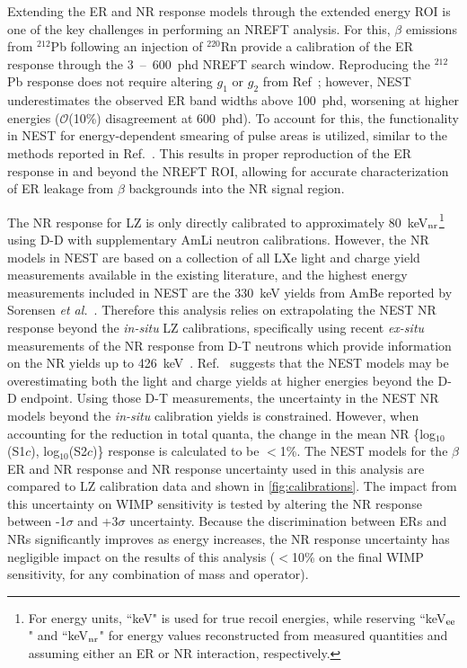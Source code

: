 \documentclass[reprint, showpacs,
preprintnumbers,
amsmath,amssymb,
aps, floatfix,
superscriptaddress,
prd, nofootinbib]{revtex4-1}
\begin{document}
Extending the ER and NR response models through the extended energy ROI is one of the key challenges in performing an NREFT analysis. For this, $\beta$ emissions from ${}^{212}$Pb following an injection of ${}^{220}$Rn provide a calibration of the ER response through the 3~--~600~phd NREFT search window. 
Reproducing the ${}^{212}$Pb response does not require altering $g_1$ or $g_2$ from Ref~\cite{LZ:SR1WS_2022}; however, NEST underestimates the observed ER band widths above 100~phd, worsening at higher energies ($\mathcal{O}$(10\%) disagreement at 600~phd). 
To account for this, the functionality in NEST for energy-dependent smearing of pulse areas is utilized, similar to the methods reported in Ref.~\cite{LUX:ER_modelling_2020}. 
This results in proper reproduction of the ER response in and beyond the NREFT ROI, allowing for accurate characterization of ER leakage from $\beta$ backgrounds into the NR signal region.
\par
The NR response for LZ is only directly calibrated to approximately 80~keV$_{\rm{nr}}$\footnote{For energy units, ``keV" is used for true recoil energies, while reserving ``keV$_{\rm{ee}}$" and ``keV$_{\rm{nr}}$" for energy values reconstructed from measured quantities and assuming either an ER or NR interaction, respectively.} using D-D with supplementary AmLi neutron calibrations. However, the NR models in NEST are based on a collection of all LXe light and charge yield measurements available in the existing literature, and 
the highest energy measurements included in NEST are the 330~keV yields from AmBe reported by Sorensen \textit{et al.}~\cite{Sorensen_2011}. 
Therefore this analysis relies on extrapolating the NEST NR response beyond the \textit{in-situ} LZ calibrations, specifically using recent \textit{ex-situ} measurements of the NR response from D-T neutrons which provide information on the NR yields up to 426~keV~\cite{DT_calib}. 
Ref.~\cite{DT_calib} suggests that the NEST models may be overestimating both the light and charge yields at higher energies beyond the D-D endpoint. 
Using those D-T measurements, the uncertainty in the NEST NR models beyond the \textit{in-situ} calibration yields is constrained. 
However, when accounting for the reduction in total quanta, the change in the mean NR \{log$_{10}$(S1$c$), log$_{10}$(S2$c$)\} response is calculated to be $<$1\%. 
The NEST models for the $\beta$ ER and NR response and NR response uncertainty used in this analysis are compared to LZ calibration data and shown in \autoref{fig:calibrations}.
The impact from this uncertainty on WIMP sensitivity is tested by altering the NR response between -1$\sigma$ and +3$\sigma$ uncertainty. 
Because the discrimination between ERs and NRs significantly improves as energy increases, the NR response uncertainty has negligible impact on the results of this analysis ($<$10\% on the final WIMP sensitivity, for any combination of mass and operator). 
\end{document}
